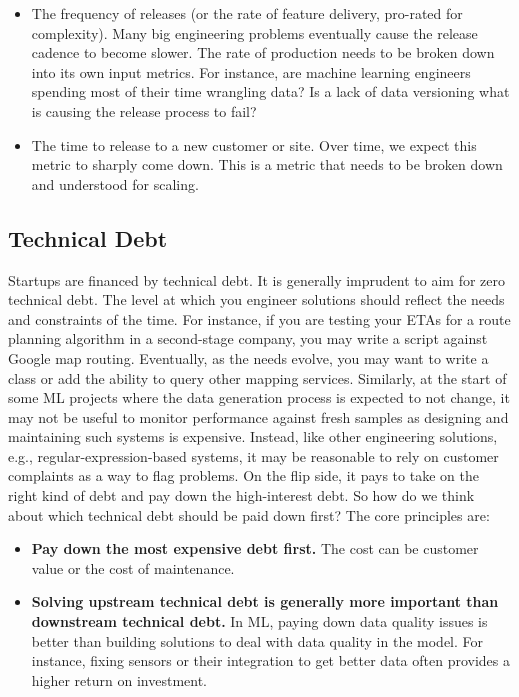 \documentclass[12pt, letterpaper]{article}
\begin{document}
\begin{itemize}
\item The frequency of releases (or the rate of feature delivery, pro-rated for complexity). Many big engineering problems eventually cause the release cadence to become slower. The rate of production needs to be broken down into its own input metrics. For instance, are machine learning engineers spending most of their time wrangling data? Is a lack of data versioning what is causing the release process to fail?

\item The time to release to a new customer or site. Over time, we expect this metric to sharply come down. This is a metric that needs to be broken down and understood for scaling.

\end{itemize}

\subsection{Technical Debt}
Startups are financed by technical debt. It is generally imprudent to aim for zero technical debt. The level at which you engineer solutions should reflect the needs and constraints of the time. For instance, if you are testing your ETAs for a route planning algorithm in a second-stage company, you may write a script against Google map routing. Eventually, as the needs evolve, you may want to write a class or add the ability to query other mapping services. Similarly, at the start of some ML projects where the data generation process is expected to not change,  it may not be useful to monitor performance against fresh samples as designing and maintaining such systems is expensive. Instead, like other engineering solutions, e.g., regular-expression-based systems, it may be reasonable to rely on customer complaints as a way to flag problems. On the flip side, it pays to take on the right kind of debt and pay down the high-interest debt. So how do we think about which technical debt should be paid down first? The core principles are:
\begin{itemize}
    \item \textbf{Pay down the most expensive debt first.} The cost can be customer value or the cost of maintenance.
    \item \textbf{Solving upstream technical debt is generally more important than downstream technical debt.} In ML, paying down data quality issues is better than building solutions to deal with data quality in the model. For instance, fixing sensors or their integration to get better data often provides a higher return on investment.
\end{itemize}
\end{document}
